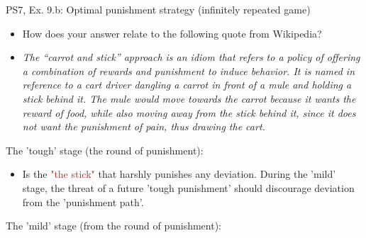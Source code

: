 \begin{frame}{PS7, Ex. 9.b: Optimal punishment strategy (infinitely repeated game)}
    \begin{itemize}
      \item[(b)] How does your answer relate to the following quote from Wikipedia?
      \item[] \textit{The “carrot and stick” approach is an idiom that refers to a policy of offering a combination of rewards and punishment to induce behavior. It is named in reference to a cart driver dangling a carrot in front of a mule and holding a stick behind it. The mule would move towards the carrot because it wants the reward of food, while also moving away from the stick behind it, since it does not want the punishment of pain, thus drawing the cart.}
    \end{itemize}
    \vspace{-4pt}
    \begin{multicols}{2}
      The 'tough' stage (the  round of punishment):
      \begin{itemize}
        \item Is the \textcolor{brown}{"the stick"} that harshly punishes any deviation. During the 'mild' stage, the threat of a future 'tough punishment' should discourage deviation from the 'punishment path'.
      \end{itemize}
      \vfill\null\columnbreak
      The 'mild' stage (from the  round of punishment):
      \vfill\null
    \end{multicols}
\end{frame}
